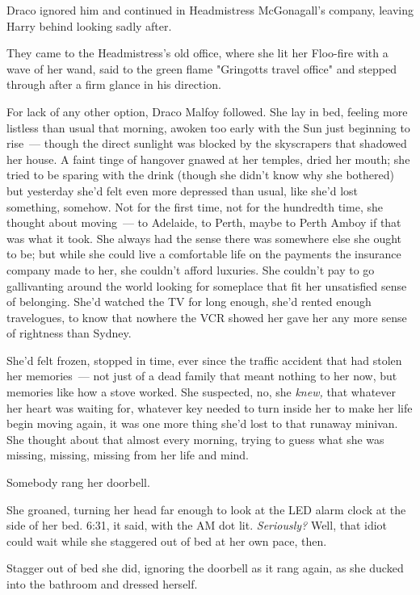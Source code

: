 Draco ignored him and continued in Headmistress McGonagall's company, leaving
Harry behind looking sadly after.

They came to the Headmistress's old office, where she lit her Floo-fire with a
wave of her wand, said to the green flame "Gringotts travel office" and stepped
through after a firm glance in his direction.

For lack of any other option, Draco Malfoy followed.
\sbreak
She lay in bed, feeling more listless than usual that morning, awoken too early
with the Sun just beginning to rise~--- though the direct sunlight was blocked by
the skyscrapers that shadowed her house. A faint tinge of hangover gnawed at
her temples, dried her mouth; she tried to be sparing with the drink (though
she didn't know why she bothered) but yesterday she'd felt{\el} even more
depressed than usual, like she'd lost something, somehow. Not for the first
time, not for the hundredth time, she thought about moving~--- to Adelaide, to
Perth, maybe to Perth Amboy if that was what it took. She always had the sense
there was somewhere else she ought to be; but while she could live a
comfortable life on the payments the insurance company made to her, she
couldn't afford luxuries. She couldn't pay to go gallivanting around the world
looking for someplace that fit her unsatisfied sense of belonging. She'd
watched the TV for long enough, she'd rented enough travelogues, to know that
nowhere the VCR showed her gave her any more sense of rightness than Sydney.

She'd felt frozen, stopped in time, ever since the traffic accident that had
stolen her memories~--- not just of a dead family that meant nothing to her now,
but memories like how a stove worked. She suspected, no, she \emph{knew,} that
whatever her heart was waiting for, whatever key needed to turn inside her to
make her life begin moving again, it was one more thing she'd lost to that
runaway minivan. She thought about that almost every morning, trying to guess
what she was missing, missing, missing from her life and mind.

Somebody rang her doorbell.

She groaned, turning her head far enough to look at the LED alarm clock at the
side of her bed. 6:31, it said, with the AM dot lit. \emph{Seriously?} Well,
that idiot could wait while she staggered out of bed at her own pace, then.

Stagger out of bed she did, ignoring the doorbell as it rang again, as she
ducked into the bathroom and dressed herself.

